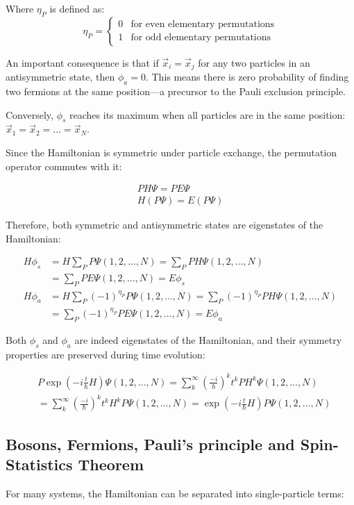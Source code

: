 \documentclass[italian]{HKNdocument}
\begin{document}
Where $\eta_P$ is defined as:
\[
\eta_P= \begin{cases}
0 & \text{for even elementary permutations} \\
1 & \text{for odd elementary permutations}
\end{cases}
\]

An important consequence is that if $\vec{x}_i=\vec{x}_j$ for any two particles in an antisymmetric state, then $\phi_a=0$. This means there is zero probability of finding two fermions at the same position—a precursor to the Pauli exclusion principle.

Conversely, $\phi_s$ reaches its maximum when all particles are in the same position: $\vec{x}_1=\vec{x}_2=\ldots=\vec{x}_N$.

Since the Hamiltonian is symmetric under particle exchange, the permutation operator commutes with it:

\begin{gather}
PH\Psi=PE\Psi\\
H(P\Psi)=E(P\Psi)
\end{gather}

Therefore, both symmetric and antisymmetric states are eigenstates of the Hamiltonian:

\begin{align}
H\phi_s&=H\sum_P P\Psi(1,2,\ldots,N)=\sum_P PH\Psi(1,2,\ldots,N)\\
&=\sum_P PE\Psi(1,2,\ldots,N)=E\phi_s \\
H\phi_a&=H\sum_P(-1)^{\eta_P}P\Psi(1,2,\ldots,N)=\sum_P(-1)^{\eta_P}PH\Psi(1,2,\ldots,N)\\
&=\sum_P(-1)^{\eta_P}PE\Psi(1,2,\ldots,N)=E\phi_a
\end{align}


Both $\phi_s$ and $\phi_a$ are indeed eigenstates of the Hamiltonian, and their symmetry properties are preserved during time evolution:

\begin{align}
&P\exp(-i\frac{t}{\hbar}H)\Psi(1,2,\ldots,N)=\sum_{k}^{\infty}(\frac{-i}{\hbar})^k t^k PH^k\Psi(1,2,\ldots,N)\\
&=\sum_{k}^{\infty}(\frac{-i}{\hbar})^k t^k H^kP\Psi(1,2,\ldots,N)=\exp(-i\frac{t}{\hbar}H)P\Psi(1,2,\ldots,N)
\end{align}

\subsection{Bosons, Fermions, Pauli's principle and Spin-Statistics Theorem}
For many systems, the Hamiltonian can be separated into single-particle terms:
\end{document}
